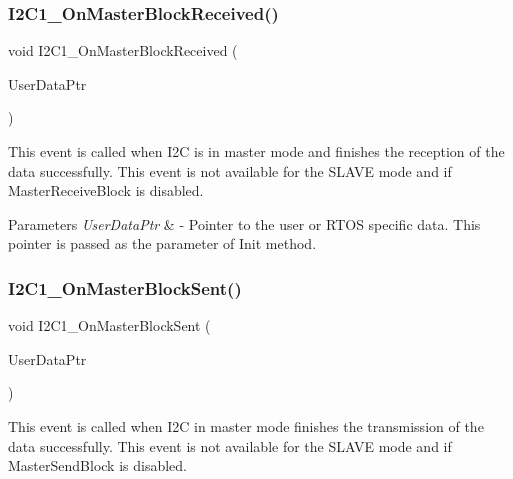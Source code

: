 \subsubsection{\texorpdfstring{I2\+C1\+\_\+\+On\+Master\+Block\+Received()}{I2C1\_OnMasterBlockReceived()}}
{\footnotesize\ttfamily void I2\+C1\+\_\+\+On\+Master\+Block\+Received (\begin{DoxyParamCaption}\item[{\hyperlink{group___p_e___types__module_ga0b66a73f87238a782318aa0be7578e35}{L\+D\+D\+\_\+\+T\+User\+Data} $\ast$}]{User\+Data\+Ptr }\end{DoxyParamCaption})}



This event is called when I2C is in master mode and finishes the reception of the data successfully. This event is not available for the S\+L\+A\+VE mode and if Master\+Receive\+Block is disabled. 


\begin{DoxyParams}{Parameters}
{\em User\+Data\+Ptr} & -\/ Pointer to the user or R\+T\+OS specific data. This pointer is passed as the parameter of Init method. \\
\hline
\end{DoxyParams}
\mbox{\label{group___events__module_gad394d39c6e6d080b1ae8cd26178003f2}} 
\subsubsection{\texorpdfstring{I2\+C1\+\_\+\+On\+Master\+Block\+Sent()}{I2C1\_OnMasterBlockSent()}}
{\footnotesize\ttfamily void I2\+C1\+\_\+\+On\+Master\+Block\+Sent (\begin{DoxyParamCaption}\item[{\hyperlink{group___p_e___types__module_ga0b66a73f87238a782318aa0be7578e35}{L\+D\+D\+\_\+\+T\+User\+Data} $\ast$}]{User\+Data\+Ptr }\end{DoxyParamCaption})}



This event is called when I2C in master mode finishes the transmission of the data successfully. This event is not available for the S\+L\+A\+VE mode and if Master\+Send\+Block is disabled. 


